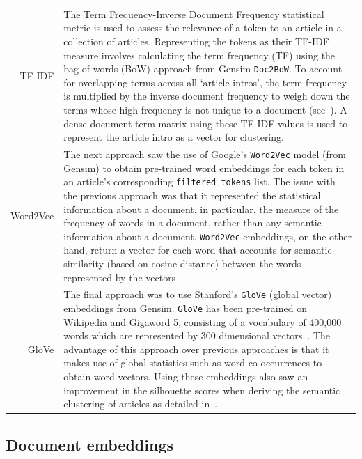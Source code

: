 \renewcommand\arraystretch{2}
\captionsetup{singlelinecheck=false, labelfont=sc, labelsep=quad}
\begin{longtable}{@{\,}r <{\hskip 2pt} !{\foo} >{\arraybackslash}p{14cm}}
\centering

TF-IDF & The Term Frequency-Inverse Document Frequency statistical metric is used to assess the relevance of a token to an article in a collection of articles. Representing the tokens as their TF-IDF measure involves calculating the term frequency (TF) using the bag of words (BoW) approach from Gensim \texttt{Doc2BoW}. To account for overlapping terms across all `article intros', the term frequency is multiplied by the inverse document frequency to weigh down the terms whose high frequency is not unique to a document (see~). A dense document-term matrix using these TF-IDF values is used to represent the article intro as a vector for clustering. \\

Word2Vec & The next approach saw the use of Google's \texttt{Word2Vec} model (from Gensim) to obtain pre-trained word embeddings for each token in an article's corresponding \texttt{filtered\_tokens} list. The issue with the previous approach was that it represented the statistical information about a document, in particular, the measure of the frequency of words in a document, rather than any semantic information about a document. \texttt{Word2Vec} embeddings, on the other hand, return a vector for each word that accounts for semantic similarity (based on cosine distance) between the words represented by the vectors~\cite{word2vec}. \\

GloVe & The final approach was to use Stanford's \texttt{GloVe} (global vector) embeddings from Gensim. \texttt{GloVe} has been pre-trained on Wikipedia and Gigaword 5, consisting of a vocabulary of 400,000 words which are represented by 300 dimensional vectors~\cite{glove}. The advantage of this approach over previous approaches is that it makes use of global statistics such as word co-occurrences to obtain word vectors. Using these embeddings also saw an improvement in the silhouette scores when deriving the semantic clustering of articles as detailed in~. \\
\end{longtable}

\newpage
\subsection{Document embeddings}

